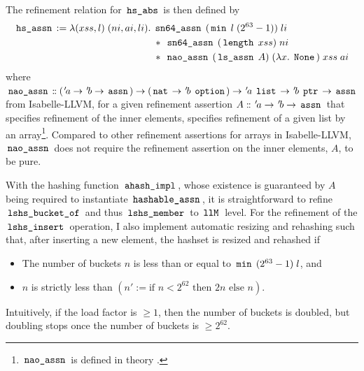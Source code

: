 The refinement relation for $\,\text{\ttfamily hs\_abs}\,$ is then defined by
\begin{align*}
	\,\text{\ttfamily hs\_assn}\, := \lambda (xss,l) \; (ni,ai,li). \; & \,\text{\ttfamily sn64\_assn}\, \; (\,\text{\ttfamily min}\, \; l \; (2^{63}-1)) \; li                                           \\
	                                                         & \ast \; \,\text{\ttfamily sn64\_assn}\, \; (\,\text{\ttfamily length}\, \; xss) \; ni                                            \\
	                                                         & \ast \; \,\text{\ttfamily nao\_assn}\, \; (\,\text{\ttfamily ls\_assn}\, \; A) \; (\lambda x. \; \,\text{\ttfamily None}\,) \; xss \; ai
\end{align*}
where $\,\text{\ttfamily nao\_assn}\, \mathrel{\mathord{:}\mkern-1.2mu\mathord{:}} ({\mskip2mu '\mskip-2mua} \rightarrow {\mskip2mu '\mskip-2mub} \rightarrow \,\text{\ttfamily assn}\,) \rightarrow (\,\text{\ttfamily nat}\, \rightarrow {\mskip2mu '\mskip-2mub} \; \,\text{\ttfamily option}\,) \rightarrow {\mskip2mu '\mskip-2mua} \; \,\text{\ttfamily list}\, \rightarrow {\mskip2mu '\mskip-2mub} \; \,\text{\ttfamily ptr}\, \rightarrow \,\text{\ttfamily assn}\,$ from Isabelle-LLVM, for a given refinement assertion $A \mathrel{\mathord{:}\mkern-1.2mu\mathord{:}} {\mskip2mu '\mskip-2mua} \rightarrow {\mskip2mu '\mskip-2mub} \rightarrow \,\text{\ttfamily assn}\,$ that specifies refinement of the inner elements, specifies refinement of a given list by an array\footnote{$\,\text{\ttfamily nao\_assn}\,$ is defined in theory .}.
Compared to other refinement assertions for arrays in Isabelle-LLVM, $\,\text{\ttfamily nao\_assn}\,$ does not require the refinement assertion on the inner elements, $A$, to be pure.

With the hashing function $\,\text{\ttfamily ahash\_impl}\,$, whose existence is guaranteed by $A$ being required to instantiate $\,\text{\ttfamily hashable\_assn}\,$, it is straightforward to refine $\,\text{\ttfamily lshs\_bucket\_of}\,$ and thus $\,\text{\ttfamily lshs\_member}\,$ to $\,\text{\ttfamily llM}\,$ level.
For the refinement of the $\,\text{\ttfamily lshs\_insert}\,$ operation, I also implement automatic resizing and rehashing such that, after inserting a new element, the hashset is resized and rehashed if
\begin{itemize}
	\item The number of buckets $n$ is less than or equal to $\,\text{\ttfamily min}\, \; (2^{63}-1) \; l$, and
	\item $n$ is strictly less than $(n' := \text{if } n < 2^{62} \text{ then } 2n \text{ else } n)$.
\end{itemize}
Intuitively, if the load factor is $\ge 1$, then the number of buckets is doubled, but doubling stops once the number of buckets is $\geq 2^{62}$.

